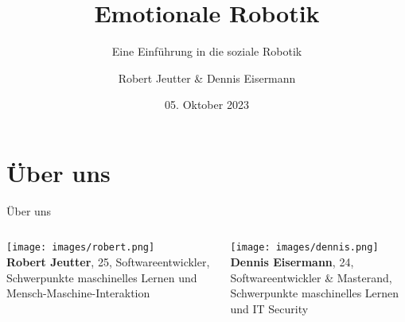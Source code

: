 \documentclass[aspectratio=169]{beamer}
\title{Emotionale Robotik}
\subtitle{Eine Einführung in die soziale Robotik}
\author{Robert Jeutter \& Dennis Eisermann}
\date{05. Oktober 2023}
\begin{document}
\maketitle

\section{Über uns}
\begin{frame}{Über uns}
  \begin{columns}
    \begin{column}{0.4\textwidth}
      \texttt{[image: images/robert.png]}\\
      \textbf{Robert Jeutter}, 25, \arabar{}
      Softwareentwickler,\\
      \scriptsize{Schwerpunkte maschinelles Lernen und Mensch-Maschine-Interaktion}
    \end{column}
    \begin{column}{0.4\textwidth}
      \texttt{[image: images/dennis.png]}\\
      \textbf{Dennis Eisermann}, 24, \arabar{}
      Softwareentwickler \& Masterand,\\
      \scriptsize{Schwerpunkte maschinelles Lernen und IT Security}
    \end{column}
  \end{columns}
\end{frame}
\end{document}
